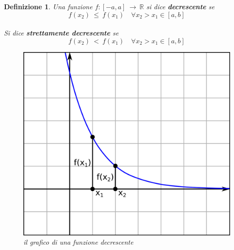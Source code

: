 \documentclass[12pt, a4paper]{article}
\theoremstyle{break}
\newtheorem{defn}{Definizione}
\theoremstyle{lemma}
\theoremstyle{lemma}
\theoremstyle{lemma}
\begin{document}
\begin{defn}
 Una funzione $f: [-a, a]\ \rightarrow \ \mathbb{R}$ si dice \textbf{decrescente} se
 \begin{equation}
   f(x_2)\ \leq \ f(x_1) \quad \forall x_2 > x_1 \in [a,b]
\end{equation}\\
 Si dice \textbf{strettamente decrescente} se\\
 \begin{equation}
  f(x_2)\ <\ f(x_1) \quad \forall x_2 > x_1 \in [a,b]
\end {equation}


\begin{figure}[ht]
  \center
  \includegraphics[scale=0.15]{funzionedecrescente}
  \caption {il grafico di una funzione decrescente}
  \label{fig:grafico_funzione_decrescente}
\end{figure}

\end{defn}
\end{document}
